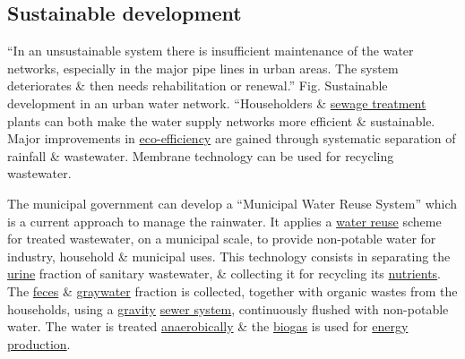 \documentclass[oneside]{book}
\numberwithin{equation}{section}
\begin{document}
\subsection{Sustainable development}
``In an unsustainable system there is insufficient maintenance of the water networks, especially in the major pipe lines in urban areas. The system deteriorates \& then needs rehabilitation or renewal.'' \textsf{Fig. Sustainable development in an urban water network.} ``Householders \& \href{https://en.wikipedia.org/wiki/Sewage_treatment}{sewage treatment} plants can both make the water supply networks more efficient \& sustainable. Major improvements in \href{https://en.wikipedia.org/wiki/Eco-efficiency}{eco-efficiency} are gained through systematic separation of rainfall \& wastewater. Membrane technology can be used for recycling wastewater.

The municipal government can develop a ``Municipal Water Reuse System'' which is a current approach to manage the rainwater. It applies a \href{https://en.wikipedia.org/wiki/Water_reuse}{water reuse} scheme for treated wastewater, on a municipal scale, to provide non-potable water for industry, household \& municipal uses. This technology consists in separating the \href{https://en.wikipedia.org/wiki/Urine}{urine} fraction of sanitary wastewater, \& collecting it for recycling its \href{https://en.wikipedia.org/wiki/Nutrient}{nutrients}. The \href{https://en.wikipedia.org/wiki/Feces}{feces} \& \href{https://en.wikipedia.org/wiki/Graywater}{graywater} fraction is collected, together with organic wastes from the households, using a \href{https://en.wikipedia.org/wiki/Gravity_sewer}{gravity} \href{https://en.wikipedia.org/wiki/Sanitary_sewer}{sewer system}, continuously flushed with non-potable water. The water is treated \href{https://en.wikipedia.org/wiki/Anaerobically_digested}{anaerobically} \& the \href{https://en.wikipedia.org/wiki/Biogas_powerplant}{biogas} is used for \href{https://en.wikipedia.org/wiki/Energy_production}{energy production}.
\end{document}
